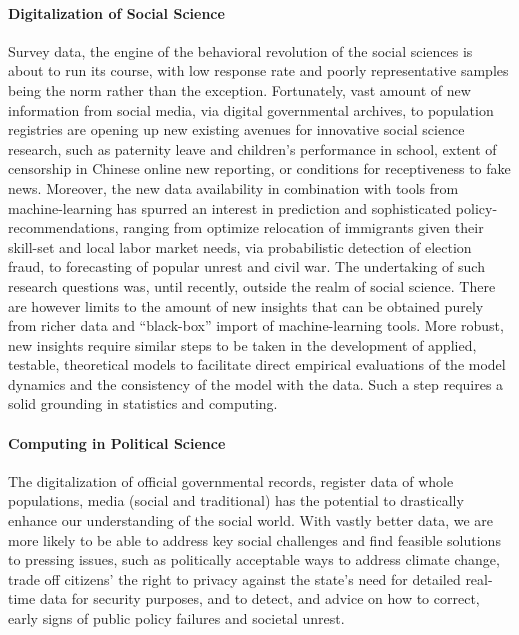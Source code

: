 \documentclass[a4paper,10pt]{article}
\begin{document}
\paragraph{Digitalization of Social Science}
Survey data, the engine of the behavioral revolution of the social sciences is about to run its course, with low response rate and poorly representative samples being the norm rather than the exception. Fortunately, vast amount of new information from social media, via digital governmental archives, to population registries are opening up new existing avenues for innovative social science research, such as paternity leave and children’s performance in school, extent of censorship in Chinese online new reporting, or conditions for receptiveness to fake news. Moreover, the new data availability in combination with tools from machine-learning has spurred an interest in prediction and sophisticated policy-recommendations, ranging from optimize relocation of immigrants given their skill-set and local labor market needs, via probabilistic detection of election fraud, to forecasting of popular unrest and civil war. The undertaking of such research questions was, until recently, outside the realm of social science. There are however limits to the amount of new insights that can be obtained purely from richer data and “black-box” import of machine-learning tools. More robust, new insights require similar steps to be taken in the development of applied, testable, theoretical models to facilitate direct empirical evaluations of the model dynamics and the consistency of the model with the data. Such a step requires a solid grounding in statistics and computing.

\paragraph{Computing in Political Science}
 The digitalization of official governmental records, register data of whole populations, media (social and traditional) has the potential to drastically enhance our understanding of the social world. With vastly better data, we are more likely to be able to address key social challenges and find feasible solutions to pressing issues, such as politically acceptable ways to address climate change, trade off citizens’ the right to privacy against the state’s need for detailed real-time data for security purposes, and to detect, and advice on how to correct, early signs of public policy failures and societal unrest. 
\end{document}
